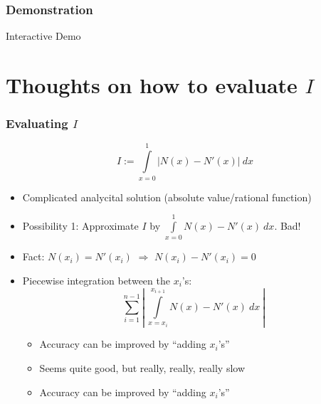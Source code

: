 \documentclass{beamer}
\begin{document}
\begin{frame}
  \frametitle{Demonstration}
  \begin{center}
    \Large{Interactive Demo}
  \end{center}
\end{frame}

\appendix{}

\section{Thoughts on how to evaluate $I$}
\label{sec:appendix-evaluate-I}

\begin{frame}
  \frametitle{Evaluating $I$}
  \begin{equation*}
    I := \int\limits_{x=0}^1 | N(x) - N'(x) |\ dx
  \end{equation*}
  \begin{itemize}
  \item Complicated analycital solution (absolute value/rational function)
  \item Possibility 1: Approximate $I$ by $\int\limits_{x=0}^1 N(x) - N'(x) \  dx$. Bad!
  \item Fact: $N(x_i) = N'(x_i)$ 
    $\Rightarrow$ $N(x_i) - N'(x_i) = 0$
  \item Piecewise integration between the $x_i$'s:
    \begin{equation*}
      \sum\limits_{i=1}^{n-1} \left|\ \int\limits_{x=x_i}^{x_{i+1}} N(x) - N'(x) \  dx\ \right|
    \end{equation*}
    \begin{itemize}
    \item Accuracy can be improved by ``adding $x_i$'s''
    \item Seems quite good, but really, really, really slow
    \item Accuracy can be improved by ``adding $x_i$'s''
    \end{itemize}
  \end{itemize}
\end{frame}
\end{document}
